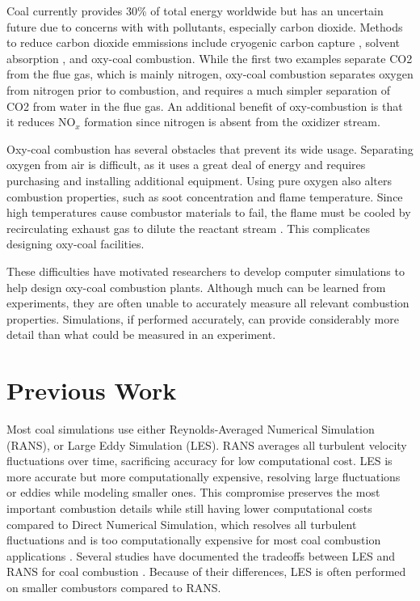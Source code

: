 \documentclass[review,3p]{elsarticle}
\begin{document}
	Coal currently provides 30\% of total energy worldwide \cite{DoE2019} 
but has an uncertain future due to concerns with with pollutants, especially carbon dioxide.  Methods to reduce carbon dioxide emmissions include cryogenic carbon capture \cite{Fazlollahi2015}, solvent absorption \cite{Yang2008}, and oxy-coal combustion.  While the first two examples separate CO2 from the flue gas, which is mainly nitrogen, oxy-coal combustion separates oxygen from nitrogen prior to combustion, and requires a much simpler separation of CO2 from water in the flue gas.   An additional benefit of oxy-combustion is that it reduces NO$_x$ formation since nitrogen is absent from the oxidizer stream.  

	Oxy-coal combustion has several obstacles that prevent its wide usage.  Separating oxygen from air is difficult, as it uses a great deal of energy and requires purchasing and installing additional equipment.  Using pure oxygen also alters combustion properties, such as soot concentration and flame temperature.  Since high temperatures cause combustor materials to fail, the flame must be cooled by recirculating exhaust gas to dilute the reactant stream \cite{Kather2009}.  This complicates designing oxy-coal facilities. 

	These difficulties have motivated researchers to develop computer simulations to help design oxy-coal combustion plants.  Although much can be learned from experiments, they are often unable to accurately measure all relevant combustion properties.  Simulations, if performed accurately, can provide considerably more detail than what could be measured in an experiment.  
 \section{Previous Work}
	 Most coal simulations use either Reynolds-Averaged Numerical Simulation (RANS), or Large Eddy Simulation (LES).  RANS averages all turbulent velocity fluctuations over time, sacrificing accuracy for low computational cost.  LES is more accurate but more computationally expensive, resolving large fluctuations or eddies while modeling smaller ones.  This compromise preserves the most important combustion details while still having lower computational costs compared to Direct Numerical Simulation, which resolves all turbulent fluctuations and is too computationally expensive for most coal combustion applications \citep{Luo2012}.  Several studies have documented the tradeoffs between LES and RANS  for coal combustion \citep{Yamamoto20111771} \citep{Gharebaghi2011} \citep{Edge2011} \citep{Stein2012} \citep{Warzecha2014732}.  Because of their differences, LES is often performed on smaller combustors compared to RANS.    
	
\end{document}

